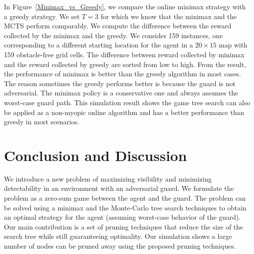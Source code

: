 \documentclass[10 pt, conference]{ieeeconf}
\begin{document}
In Figure~\ref{Minimax_vs_Greedy}, we compare the online minimax strategy with a greedy strategy. We set $T=3$ for which we know that the minimax and the MCTS perform comparably. We compute the difference between the reward collected by the minimax and the greedy. We consider 159 instances, one corresponding to a different starting location for the agent in a $20\times 15$ map with 159 obstacle-free grid cells. The difference between reward collected by minimax and the reward collected by greedy are sorted from low to high. From the result, the performance of minimax is better than the greedy algorithm in most cases.  The reason sometimes the greedy performs better is because the guard is not adversarial. The minimax policy is a conservative one and always assumes the worst-case guard path. This simulation result shows the game tree search can also be applied as a non-myopic online algorithm and has a better performance than greedy in most scenarios.









\section{Conclusion and Discussion} \label{sec:con}
We introduce a new problem of maximizing visibility and minimizing detectability in an environment with an adversarial guard. We formulate the problem as a zero-sum game between the agent and the guard. The problem can be solved using a minimax and the Monte-Carlo tree search techniques to obtain an optimal strategy for the agent (assuming worst-case behavior of the guard). Our main contribution is a set of pruning techniques that reduce the size of the search tree while still guaranteeing optimality. Our simulation shows a large number of nodes can be pruned away using the proposed pruning techniques. %

\end{document}
